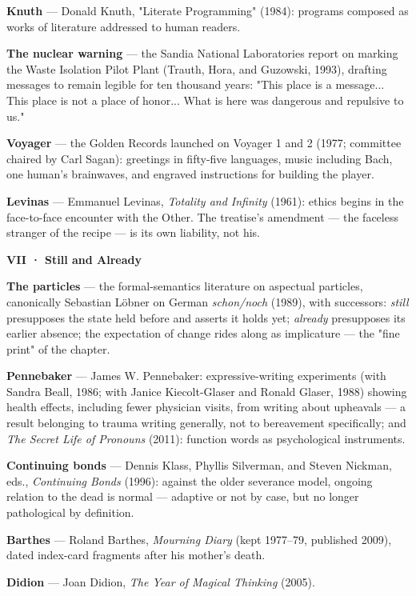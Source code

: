 \documentclass[11pt]{article}
\begin{document}
\textbf{Knuth} — Donald Knuth, "Literate Programming" (1984): programs composed as works of literature addressed to human readers.

\textbf{The nuclear warning} — the Sandia National Laboratories report on marking the Waste Isolation Pilot Plant (Trauth, Hora, and Guzowski, 1993), drafting messages to remain legible for ten thousand years: "This place is a message... This place is not a place of honor... What is here was dangerous and repulsive to us."

\textbf{Voyager} — the Golden Records launched on Voyager 1 and 2 (1977; committee chaired by Carl Sagan): greetings in fifty-five languages, music including Bach, one human's brainwaves, and engraved instructions for building the player.

\textbf{Levinas} — Emmanuel Levinas, \emph{Totality and Infinity} (1961): ethics begins in the face-to-face encounter with the Other. The treatise's amendment — the faceless stranger of the recipe — is its own liability, not his.

\textbf{VII · Still and Already}

\textbf{The particles} — the formal-semantics literature on aspectual particles, canonically Sebastian Löbner on German \emph{schon/noch} (1989), with successors: \emph{still} presupposes the state held before and asserts it holds yet; \emph{already} presupposes its earlier absence; the expectation of change rides along as implicature — the "fine print" of the chapter.

\textbf{Pennebaker} — James W. Pennebaker: expressive-writing experiments (with Sandra Beall, 1986; with Janice Kiecolt-Glaser and Ronald Glaser, 1988) showing health effects, including fewer physician visits, from writing about upheavals — a result belonging to trauma writing generally, not to bereavement specifically; and \emph{The Secret Life of Pronouns} (2011): function words as psychological instruments.

\textbf{Continuing bonds} — Dennis Klass, Phyllis Silverman, and Steven Nickman, eds., \emph{Continuing Bonds} (1996): against the older severance model, ongoing relation to the dead is normal — adaptive or not by case, but no longer pathological by definition.

\textbf{Barthes} — Roland Barthes, \emph{Mourning Diary} (kept 1977–79, published 2009), dated index-card fragments after his mother's death.

\textbf{Didion} — Joan Didion, \emph{The Year of Magical Thinking} (2005).
\end{document}

